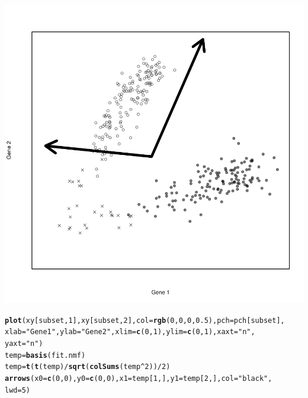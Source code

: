 \documentclass{article}\usepackage[]{graphicx}\usepackage[]{color}
\makeatletter
\def\maxwidth{ %
  \ifdim\Gin@nat@width>\linewidth
    \linewidth
  \else
    \Gin@nat@width
  \fi
}
\newcommand{\hlnum}[1]{\textcolor[rgb]{0.686,0.059,0.569}{#1}}%
\newcommand{\hlstr}[1]{\textcolor[rgb]{0.192,0.494,0.8}{#1}}%
\newcommand{\hlopt}[1]{\textcolor[rgb]{0,0,0}{#1}}%
\newcommand{\hlstd}[1]{\textcolor[rgb]{0.345,0.345,0.345}{#1}}%
\newcommand{\hlkwb}[1]{\textcolor[rgb]{0.69,0.353,0.396}{#1}}%
\newcommand{\hlkwc}[1]{\textcolor[rgb]{0.333,0.667,0.333}{#1}}%
\newcommand{\hlkwd}[1]{\textcolor[rgb]{0.737,0.353,0.396}{\textbf{#1}}}%
\newenvironment{kframe}{%
 \def\at@end@of@kframe{}%
 \ifinner\ifhmode%
  \def\at@end@of@kframe{\end{minipage}}%
  \begin{minipage}{\columnwidth}%
 \fi\fi%
 \def\FrameCommand##1{\hskip\@totalleftmargin \hskip-\fboxsep
 \colorbox{shadecolor}{##1}\hskip-\fboxsep
     \hskip-\linewidth \hskip-\@totalleftmargin \hskip\columnwidth}%
 \MakeFramed {\advance\hsize-\width
   \@totalleftmargin\z@ \linewidth\hsize
   \@setminipage}}%
 {\par\unskip\endMakeFramed%
 \at@end@of@kframe}
\newenvironment{knitrout}{}{} %
\makeatother
\begin{document}
\begin{knitrout}
{\centering \includegraphics[width=\maxwidth]{figure/plots-3} 

}


\begin{kframe}\begin{alltt}
\hlkwd{plot}\hlstd{(xy[subset,} \hlnum{1}\hlstd{], xy[subset,} \hlnum{2}\hlstd{],} \hlkwc{col} \hlstd{=} \hlkwd{rgb}\hlstd{(}\hlnum{0}\hlstd{,} \hlnum{0}\hlstd{,} \hlnum{0}\hlstd{,} \hlnum{0.5}\hlstd{),} \hlkwc{pch} \hlstd{= pch[subset],}
    \hlkwc{xlab} \hlstd{=} \hlstr{"Gene 1"}\hlstd{,} \hlkwc{ylab} \hlstd{=} \hlstr{"Gene 2"}\hlstd{,} \hlkwc{xlim} \hlstd{=} \hlkwd{c}\hlstd{(}\hlnum{0}\hlstd{,} \hlnum{1}\hlstd{),} \hlkwc{ylim} \hlstd{=} \hlkwd{c}\hlstd{(}\hlnum{0}\hlstd{,} \hlnum{1}\hlstd{),} \hlkwc{xaxt} \hlstd{=} \hlstr{"n"}\hlstd{,}
    \hlkwc{yaxt} \hlstd{=} \hlstr{"n"}\hlstd{)}
\hlstd{temp} \hlkwb{=} \hlkwd{basis}\hlstd{(fit.nmf)}
\hlstd{temp} \hlkwb{=} \hlkwd{t}\hlstd{(}\hlkwd{t}\hlstd{(temp)}\hlopt{/}\hlkwd{sqrt}\hlstd{(}\hlkwd{colSums}\hlstd{(temp}\hlopt{^}\hlnum{2}\hlstd{))}\hlopt{/}\hlnum{2}\hlstd{)}
\hlkwd{arrows}\hlstd{(}\hlkwc{x0} \hlstd{=} \hlkwd{c}\hlstd{(}\hlnum{0}\hlstd{,} \hlnum{0}\hlstd{),} \hlkwc{y0} \hlstd{=} \hlkwd{c}\hlstd{(}\hlnum{0}\hlstd{,} \hlnum{0}\hlstd{),} \hlkwc{x1} \hlstd{= temp[}\hlnum{1}\hlstd{, ],} \hlkwc{y1} \hlstd{= temp[}\hlnum{2}\hlstd{, ],} \hlkwc{col} \hlstd{=} \hlstr{"black"}\hlstd{,}
    \hlkwc{lwd} \hlstd{=} \hlnum{5}\hlstd{)}
\end{alltt}
\end{kframe}


\end{knitrout}
\end{document}
